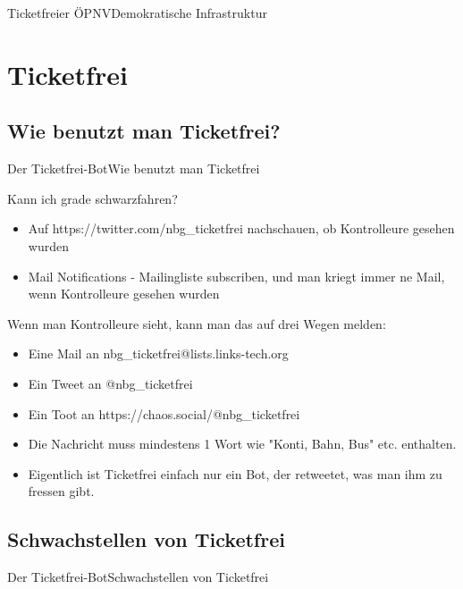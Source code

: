 \documentclass[10pt]{beamer}
\begin{document}
{\begin{frame}{Ticketfreier ÖPNV}{Demokratische Infrastruktur}
\end{frame}


\section{Ticketfrei}
\subsection{Wie benutzt man Ticketfrei?}
\begin{frame}{Der Ticketfrei-Bot}{Wie benutzt man Ticketfrei}

\begin{block}{Kann ich grade schwarzfahren?}
  \begin{itemize}
    \item Auf https://twitter.com/nbg\_ticketfrei nachschauen, ob Kontrolleure gesehen wurden
    \item Mail Notifications - Mailingliste subscriben, und man kriegt immer ne Mail, wenn Kontrolleure gesehen wurden
  \end{itemize}
\end{block}

\begin{block}{Wenn man Kontrolleure sieht, kann man das auf drei Wegen melden:}
  \begin{itemize}
    \item Eine Mail an nbg\_ticketfrei@lists.links-tech.org
    \item Ein Tweet an @nbg\_ticketfrei
    \item Ein Toot an https://chaos.social/@nbg\_ticketfrei
  \end{itemize}
\end{block}

\begin{itemize}
    \item<2-> Die Nachricht muss mindestens 1 Wort wie "Konti, Bahn, Bus" etc. enthalten.
    \item<2-> Eigentlich ist Ticketfrei einfach nur ein Bot, der retweetet, was man ihm zu fressen gibt.
\end{itemize}

\end{frame}

\subsection{Schwachstellen von Ticketfrei}
\begin{frame}{Der Ticketfrei-Bot}{Schwachstellen von Ticketfrei}


\end{frame}}
\end{document}
